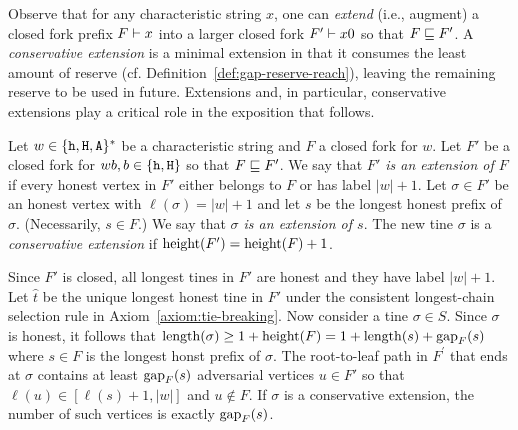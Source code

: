 Observe that for any characteristic string $x$, 
one can \emph{extend} (i.e., augment) a closed fork prefix $F \vdash x$ 
into a larger closed fork $F' \vdash x0$ so that $F \sqsubseteq F'$. 
A \emph{conservative extension} is a minimal extension in that 
it consumes the least amount of reserve (cf. Definition~\ref{def:gap-reserve-reach}), 
leaving the remaining reserve to be used in future.
Extensions and, in particular, conservative extensions 
play a critical role in the exposition that follows. 

\begin{definition}[Extensions]\label{def:extension}  
  Let $w \in \{\mathtt{h}, \mathtt{H}, \mathtt{A}\}^*$ be a characteristic string 
  and $F$ a closed fork for $w$. 
  Let $F'$ be a closed fork for $wb, b \in \{\mathtt{h}, \mathtt{H}\}$ 
  so that $F \sqsubseteq F'$. 
  We say that \emph{$F'$ is an extension of $F$} if 
  every honest vertex in $F'$ either belongs to $F$ or has label $|w| + 1$. 
  Let $\sigma \in F'$ be an honest vertex with $\ell(\sigma) = |w| + 1$ 
  and let $s$ be the longest honest prefix of $\sigma$. 
  (Necessarily, $s \in F$.)
  We say that \emph{$\sigma$ is an extension of $s$}. 
  The new tine $\sigma$ is a \emph{conservative extension} if 
  $\operatorname{height}(F') = \operatorname{height}(F) + 1$.  
\end{definition} 
Since $F'$ is closed, all longest tines in $F'$ are honest and they have label $|w| + 1$.
Let $\hat{t}$ be the unique longest honest tine in $F'$ 
under the consistent longest-chain selection rule 
in Axiom~\ref{axiom:tie-breaking}.
Now consider a tine $\sigma \in S$. 
Since $\sigma$ is honest, 
it follows that 
$\operatorname{length}(\sigma) 
\geq 1 + \operatorname{height}(F) 
= 1 + \operatorname{length}(s) + \operatorname{gap}_F(s)$ 
where $s \in F$ is the longest honst prefix of $\sigma$.
The root-to-leaf path in $F^\prime$ 
that ends at $\sigma$ 
contains at least $\operatorname{gap}_F(s)$ adversarial vertices $u \in F'$ 
so that $\ell(u) \in [\ell(s) + 1, |w|]$ and 
$u \not \in F$. 
If $\sigma$ is a conservative extension, 
the number of such vertices is exactly $\operatorname{gap}_F(s)$. 


